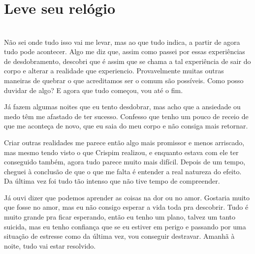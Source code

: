 \newpage


\ifdefined\useChapters
\chapter{Leve seu relógio}
\else
\chapter{}
\fi


Não sei onde tudo isso vai me levar, mas ao que tudo indica, a partir de agora tudo pode acontecer. Algo me diz que, assim como passei por essas experiências de desdobramento, descobri que é assim que se chama a tal experiência de sair do corpo e alterar a realidade que experiencio. Provavelmente muitas outras maneiras de quebrar o que acreditamos ser o comum são possíveis. Como posso duvidar de algo? E agora que tudo começou, vou até o fim.

Já fazem algumas noites que eu tento desdobrar, mas acho que a ansiedade ou medo têm me afastado de ter sucesso. Confesso que tenho um pouco de receio de que me aconteça de novo, que eu saia do meu corpo e não consiga mais retornar.

Criar outras realidades me parece então algo mais promissor e menos arriscado, mas mesmo tendo visto o que Crispim realizou, e enquanto estava com ele ter conseguido também, agora tudo parece muito mais difícil. Depois de um tempo, cheguei à conclusão de que o que me falta é entender a real natureza do efeito. Da última vez foi tudo tão intenso que não tive tempo de compreender.

Já ouvi dizer que podemos aprender as coisas na dor ou no amor. Gostaria muito que fosse no amor, mas eu não consigo esperar a vida toda pra descobrir. Tudo é muito grande pra ficar esperando, então eu tenho um plano, talvez um tanto suicida, mas eu tenho confiança que se eu estiver em perigo e passando por uma situação de estresse como da última vez, vou conseguir destravar. Amanhã à noite, tudo vai estar resolvido.

